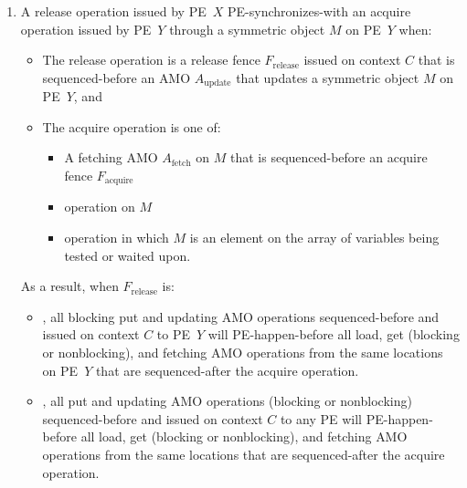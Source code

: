 \begin{enumerate}
\item A release operation issued by \ac{PE}~$X$
  \ac{PE}-synchronizes-with an acquire operation issued by \ac{PE}~$Y$
  through a symmetric object $M$ on \ac{PE}~$Y$ when:
  \begin{itemize}
  \item The release operation is a release fence
    $F_{\mathrm{release}}$ issued on context $C$ that is
    sequenced-before an \ac{AMO} $A_{\mathrm{update}}$
    that updates a symmetric object $M$ on \ac{PE}~$Y$,
    and
  \item The acquire operation is one of:
    \begin{itemize}
    \item A fetching \ac{AMO} $A_{\mathrm{fetch}}$ on $M$ that is
      sequenced-before an acquire fence $F_{\mathrm{acquire}}$
    \item {} operation on $M$
    \item {}
      operation in which $M$ is an element on the array of variables
      being tested or waited upon.
    \end{itemize}
  \end{itemize}
  As a result, when $F_{\mathrm{release}}$ is:
  \begin{itemize}
  \item {}, all blocking put and updating \ac{AMO}
    operations sequenced-before  and issued on
    context $C$ to \ac{PE}~$Y$ will \ac{PE}-happen-before all load,
    get (blocking or nonblocking), and fetching \ac{AMO} operations
    from the same locations on \ac{PE}~$Y$ that are sequenced-after
    the acquire operation.
  \item {}, all put and updating \ac{AMO} operations
    (blocking or nonblocking) sequenced-before  and
    issued on context $C$ to any \ac{PE} will \ac{PE}-happen-before
    all load, get (blocking or nonblocking), and fetching \ac{AMO}
    operations from the same locations that are sequenced-after the
    acquire operation.
  \end{itemize}


\end{enumerate}
